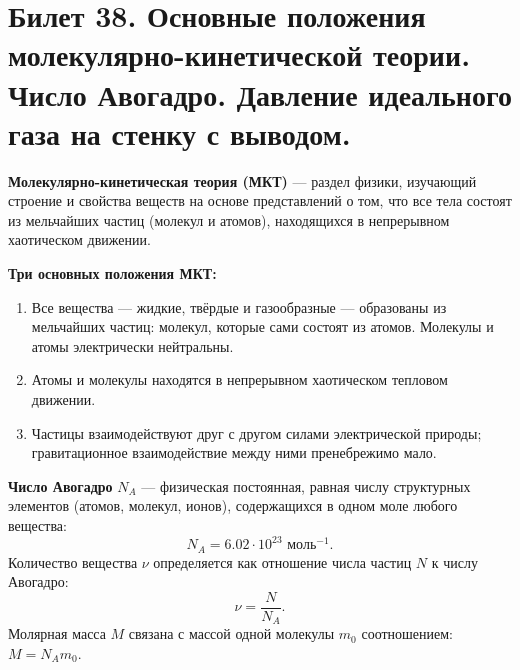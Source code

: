 \section{Билет 38. Основные положения молекулярно-кинетической теории. Число Авогадро. Давление идеального газа на стенку с выводом.}

\begin{definition}
\textbf{Молекулярно-кинетическая теория (МКТ)} --- раздел физики, изучающий строение и свойства веществ на основе представлений о том, что все тела состоят из мельчайших частиц (молекул и атомов), находящихся в непрерывном хаотическом движении.
\par\noindent\textbf{Три основных положения МКТ:}
\begin{enumerate}
    \item Все вещества --- жидкие, твёрдые и газообразные --- образованы из мельчайших частиц: молекул, которые сами состоят из атомов. Молекулы и атомы электрически нейтральны.
    \item Атомы и молекулы находятся в непрерывном хаотическом тепловом движении.
    \item Частицы взаимодействуют друг с другом силами электрической природы; гравитационное взаимодействие между ними пренебрежимо мало.
\end{enumerate}
\end{definition}

\begin{definition}
\textbf{Число Авогадро} $N_A$ --- физическая постоянная, равная числу структурных элементов (атомов, молекул, ионов), содержащихся в одном моле любого вещества:
\begin{equation}
    N_A = 6.02 \cdot 10^{23} \text{ моль}^{-1}. \label{eq:avogadro_38}
\end{equation}
Количество вещества $\nu$ определяется как отношение числа частиц $N$ к числу Авогадро:
\begin{equation}
    \nu = \frac{N}{N_A}.
\end{equation}
Молярная масса $M$ связана с массой одной молекулы $m_0$ соотношением: $M = N_A m_0$.
\end{definition}

